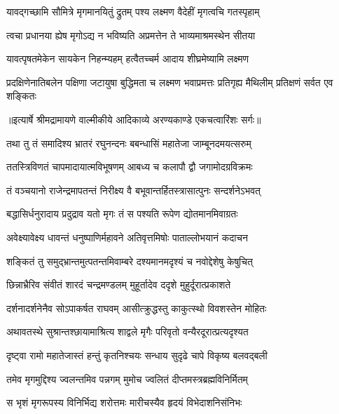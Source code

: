 \twolineshloka
{यावद्गच्छामि सौमित्रे मृगमानयितुं द्रुतम्}
{पश्य लक्ष्मण वैदेहीं मृगत्वचि गतस्पृहाम्} %

\twolineshloka
{त्वचा प्रधानया ह्येष मृगोऽद्य न भविष्यति}
{अप्रमत्तेन ते भाव्यमाश्रमस्थेन सीतया} %

\twolineshloka
{यावत्पृषतमेकेन सायकेन निहन्म्यहम्}
{हत्वैतच्चर्म आदाय शीघ्रमेष्यामि लक्ष्मण} %

\fourlineindentedshloka
{प्रदक्षिणेनातिबलेन पक्षिणा}
{जटायुषा बुद्धिमता च लक्ष्मण}
{भवाप्रमत्तः प्रतिगृह्य मैथिलीम्}
{प्रतिक्षणं सर्वत एव शङ्कितः} %


{॥इत्यार्षे श्रीमद्रामायणे वाल्मीकीये आदिकाव्ये अरण्यकाण्डे एकचत्वारिंशः सर्गः॥}


\twolineshloka
{तथा तु तं समादिश्य भ्रातरं रघुनन्दनः}
{बबन्धासिं महातेजा जाम्बूनदमयत्सरुम्} %

\twolineshloka
{ततस्त्रिविणतं चापमादायात्मविभूषणम्}
{आबध्य च कलापौ द्वौ जगामोदग्रविक्रमः} %

\twolineshloka
{तं वञ्चयानो राजेन्द्रमापतन्तं निरीक्ष्य वै}
{बभूवान्तर्हितस्त्रासात्पुनः सन्दर्शनेऽभवत्} %

\twolineshloka
{बद्धासिर्धनुरादाय प्रदुद्राव यतो मृगः}
{तं स पश्यति रूपेण द्योतमानमिवाग्रतः} %

\twolineshloka
{अवेक्ष्यावेक्ष्य धावन्तं धनुष्पाणिर्महावने}
{अतिवृत्तमिषोः पाताल्लोभयानं कदाचन} %

\twolineshloka
{शङ्कितं तु समुद्भ्रान्तमुत्पतन्तमिवाम्बरे}
{दश्यमानमदृश्यं च नवोद्देशेषु केषुचित्} %

\twolineshloka
{छिन्नाभ्रैरिव संवीतं शारदं चन्द्रमण्डलम्}
{मुहूर्तादेव ददृशे मुहुर्दूरात्प्रकाशते} %

\twolineshloka
{दर्शनादर्शनेनैव सोऽपाकर्षत राघवम्}
{आसीत्क्रुद्धस्तु काकुत्स्थो विवशस्तेन मोहितः} %

\twolineshloka
{अथावतस्थे सुश्रान्तश्छायामाश्रित्य शाद्वले}
{मृगैः परिवृतो वन्यैरदूरात्प्रत्यदृश्यत} %

\twolineshloka
{दृष्ट्वा रामो महातेजास्तं हन्तुं कृतनिश्चयः}
{सन्धाय सुदृढे चापे विकृष्य बलवद्बली} %

\twolineshloka
{तमेव मृगमुद्दिश्य ज्वलन्तमिव पन्नगम्}
{मुमोच ज्वलितं दीप्तमस्त्रब्रह्मविनिर्मितम्} %

\twolineshloka
{स भृशं मृगरूपस्य विनिर्भिद्य शरोत्तमः}
{मारीचस्यैव हृदयं विभेदाशनिसंनिभः} %

